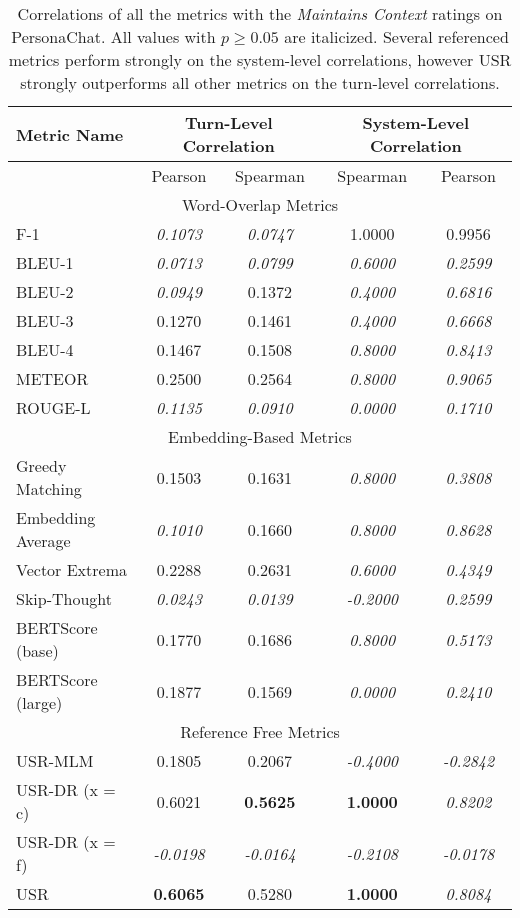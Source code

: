 \documentclass[11pt,a4paper]{article}
\begin{document}
\begin{table*}
    \centering
    \renewcommand*{\arraystretch}{1.2}
    \begin{tabular}{|l|c|c|c|c|}
    \hline
        \textbf{Metric Name} & \multicolumn{2}{|c|}{\textbf{Turn-Level Correlation}} & \multicolumn{2}{|c|}{\textbf{System-Level Correlation}}  \\ \hline
         & Pearson & Spearman & Spearman & Pearson \\ \hline
         \multicolumn{5}{|c|}{Word-Overlap Metrics} \\ \hline
F-1 & \textit{0.1073} & \textit{0.0747} & 1.0000 & 0.9956 \\
BLEU-1 & \textit{0.0713} & \textit{0.0799} & \textit{0.6000} & \textit{0.2599} \\
BLEU-2 & \textit{0.0949} & 0.1372 & \textit{0.4000} & \textit{0.6816} \\
BLEU-3 & 0.1270 & 0.1461 & \textit{0.4000} & \textit{0.6668} \\
BLEU-4 & 0.1467 & 0.1508 & \textit{0.8000} & \textit{0.8413} \\
METEOR & 0.2500 & 0.2564 & \textit{0.8000} & \textit{0.9065} \\
ROUGE-L & \textit{0.1135} & \textit{0.0910} & \textit{0.0000} & \textit{0.1710} \\\hline 
 \multicolumn{5}{|c|}{Embedding-Based Metrics} \\ \hline
Greedy Matching & 0.1503 & 0.1631 & \textit{0.8000} & \textit{0.3808} \\
Embedding Average & \textit{0.1010} & 0.1660 & \textit{0.8000} & \textit{0.8628} \\
Vector Extrema & 0.2288 & 0.2631 & \textit{0.6000} & \textit{0.4349} \\
Skip-Thought & \textit{0.0243} & \textit{0.0139} & \textit{-0.2000} & \textit{0.2599} \\
BERTScore (base) & 0.1770 & 0.1686 & \textit{0.8000} & \textit{0.5173} \\
BERTScore (large) & 0.1877 & 0.1569 & \textit{0.0000} & \textit{0.2410} \\\hline 
 \multicolumn{5}{|c|}{Reference Free Metrics} \\ \hline
USR-MLM & 0.1805 & 0.2067 & \textit{-0.4000} & \textit{-0.2842} \\
USR-DR (x = c) & 0.6021 & \textbf{0.5625} & \textbf{1.0000} & \textit{0.8202} \\
USR-DR (x = f) & \textit{-0.0198} & \textit{-0.0164} & \textit{-0.2108} & \textit{-0.0178} \\
USR & \textbf{0.6065} & 0.5280 & \textbf{1.0000} & \textit{0.8084} \\ \hline
    \end{tabular}
    \caption{Correlations of all the metrics with the \textit{Maintains Context} ratings on PersonaChat. All values with $p \geq 0.05$ are italicized. Several referenced metrics perform strongly on the system-level correlations, however USR strongly outperforms all other metrics on the turn-level correlations.}
    
\end{table*}
\end{document}
